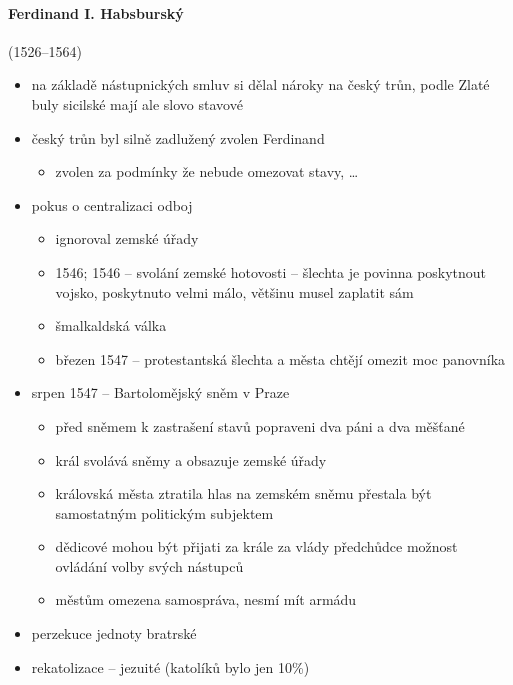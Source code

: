 \paragraph{Ferdinand I. Habsburský} (1526--1564)
\begin{itemize}
\item na základě nástupnických smluv si dělal nároky na český trůn, podle Zlaté buly sicilské mají ale slovo stavové
\item český trůn byl silně zadlužený \ra zvolen Ferdinand
	\begin{itemize}
	\item zvolen za podmínky že nebude omezovat stavy, \ldots
	\end{itemize}
\item pokus o centralizaci \ra odboj
	\begin{itemize}
	\item ignoroval zemské úřady
	\item 1546; 1546 -- svolání zemské hotovosti -- šlechta je povinna poskytnout vojsko, poskytnuto velmi málo, většinu musel zaplatit sám
	\item šmalkaldská válka
	\item březen 1547 -- protestantská šlechta a města chtějí omezit moc panovníka
	\end{itemize}
\item srpen 1547 -- Bartolomějský sněm v Praze
	\begin{itemize}
	\item před sněmem k zastrašení stavů popraveni dva páni a dva měšťané
	\item král svolává sněmy a obsazuje zemské úřady
	\item královská města ztratila hlas na zemském sněmu \ra přestala být samostatným politickým subjektem
	\item dědicové mohou být přijati za krále za vlády předchůdce \ra možnost ovládání volby svých nástupců
	\item městům omezena samospráva, nesmí mít armádu
	\end{itemize}
\item perzekuce jednoty bratrské
\item rekatolizace -- jezuité (katolíků bylo jen 10\%)
\end{itemize}

